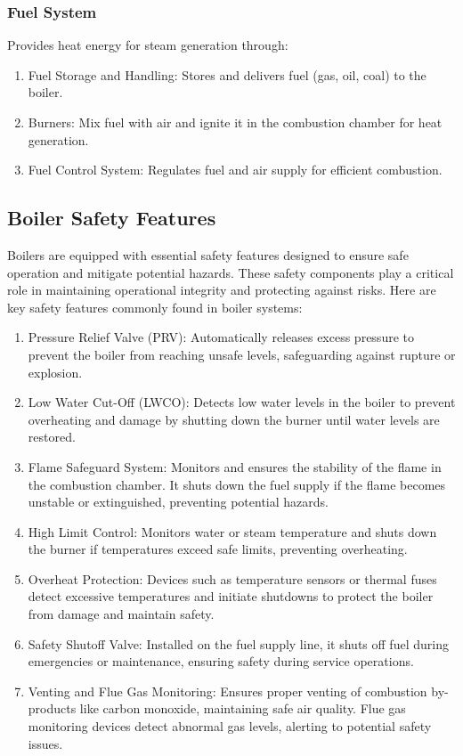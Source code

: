 \subsubsection{Fuel System}
Provides heat energy for steam generation through:
\begin{enumerate}
\item Fuel Storage and Handling: Stores and delivers fuel (gas, oil, coal) to the boiler.
\item Burners: Mix fuel with air and ignite it in the combustion chamber for heat generation.
\item Fuel Control System: Regulates fuel and air supply for efficient combustion.

\end{enumerate}

\subsection{Boiler Safety Features}
Boilers are equipped with essential safety features designed to ensure safe operation and mitigate potential hazards. These safety components play a critical role in maintaining operational integrity and protecting against risks. Here are key safety features commonly found in boiler systems:

\begin{enumerate}
    \item Pressure Relief Valve (PRV): Automatically releases excess pressure to prevent the boiler from reaching unsafe levels, safeguarding against rupture or explosion.
    \item Low Water Cut-Off (LWCO): Detects low water levels in the boiler to prevent overheating and damage by shutting down the burner until water levels are restored.
    \item Flame Safeguard System: Monitors and ensures the stability of the flame in the combustion chamber. It shuts down the fuel supply if the flame becomes unstable or extinguished, preventing potential hazards.
    \item High Limit Control: Monitors water or steam temperature and shuts down the burner if temperatures exceed safe limits, preventing overheating.
    \item Overheat Protection: Devices such as temperature sensors or thermal fuses detect excessive temperatures and initiate shutdowns to protect the boiler from damage and maintain safety.
    \item Safety Shutoff Valve: Installed on the fuel supply line, it shuts off fuel during emergencies or maintenance, ensuring safety during service operations.
    \item Venting and Flue Gas Monitoring: Ensures proper venting of combustion by-products like carbon monoxide, maintaining safe air quality. Flue gas monitoring devices detect abnormal gas levels, alerting to potential safety issues.
\end{enumerate}

